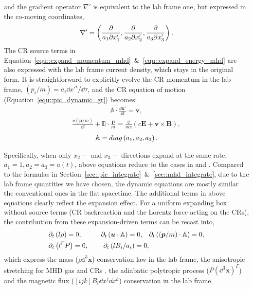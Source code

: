\documentclass[fleqn,usenatbib]{mnras}
\begin{document}
and the gradient operator $\nabla'$ is equivalent to the lab frame one, but expressed in the co-moving coordinates,
\begin{align}
    \nabla' = \left(\frac{\partial}{a_1 \partial x'_1} ,\frac{\partial}{a_2 \partial x'_2}, \frac{\partial}{a_3\partial x'_3} \right). \notag
\end{align}
The CR source terms in Equation~\ref{equ::expand_momentum_mhd}~\&~\ref{equ::expand_energy_mhd} are also expressed with the lab frame current density, which stays in the original form. It is straightforward to explicitly evolve the CR momentum in the lab frame, $\left(p_i / m\right)= a_i \dd x'^i / \dd \tau$, and the CR equation of motion (Equation~\ref{equ::pic_dynamic_gr}) becomes:
\begin{align}
    \mathbb{A} \cdot \frac{\dd \boldsymbol{x}'}{\dd t} = \boldsymbol{v}, 
\end{align}
\begin{align}
    \frac{\dd \left(\boldsymbol{p} / m\right)}{\dd t} + \mathbb{D} \cdot \frac{\boldsymbol{p}}{m} = \frac{q}{mc} \left(c \boldsymbol{E} + \boldsymbol{v} \times \boldsymbol{B} \right), 
\end{align}
\begin{align}
    \mathbb{A} = diag \left(a_1, a_2, a_3\right).\notag
\end{align}

Specifically, when only $x_2-$ and $x_3-$ directions expand at the same rate, $a_1 = 1, a_2=a_3=a(t)$, above equations reduce to the cases in \citet{1993PhRvL..70.2190G} and \citet{2015ApJ...800...88S}. Compared to the formulas in Section~\ref{sec::pic_integrate}~\&~\ref{sec::mhd_integrate}, due to the lab frame quantities we have chosen, the dynamic equations are mostly similar the conventional ones in the flat spacetime. The additional terms in above equations clearly reflect the expansion effect. For a uniform expanding box without source terms (CR backreaction and the Lorentz force acting on the CRs), the contribution from these expansion-driven terms can be recast into,
\begin{align}
    &\partial_t \left(l \rho \right)= 0, \quad
    &\partial_t \left(\boldsymbol{u} \cdot \mathbb{A}\right) = 0,\quad
    &\partial_t \left(\left(\boldsymbol{p} / m\right) \cdot \mathbb{A}\right) = 0, \notag \\
    &\partial_t \left( l^\Gamma P\right) = 0,\quad
	&\partial_t \left( l B_i / a_i \right) = 0, \label{equ::expansion_driven}
\end{align}
which express the mass ($\rho \dd^3 \boldsymbol{x}$) conservation law in the lab frame, the anisotropic stretching for MHD gas and CRs \citep{1993PhRvL..70.2190G}, the adiabatic polytropic process ($P \left(\dd^3 \boldsymbol{x}\right)^\Gamma$) and the magnetic flux ($\left[ijk\right]B_i \dd x^j \dd x^k$) conservation in the lab frame.
\end{document}

